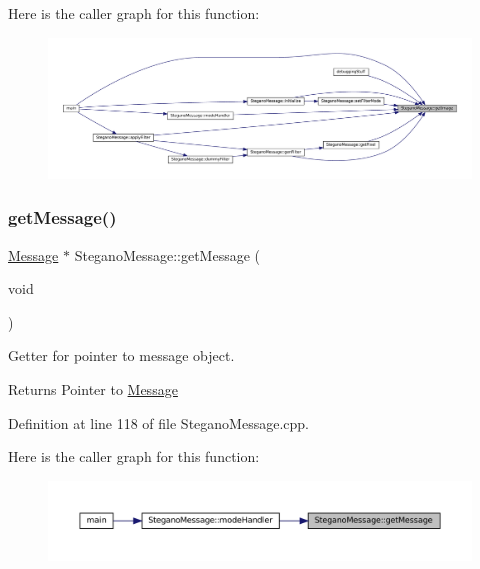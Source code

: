 Here is the caller graph for this function\+:
\nopagebreak
\begin{figure}[H]
\begin{center}
\leavevmode
\includegraphics[width=350pt]{classSteganoMessage_a2e3ad705a0219edfd2150f3f7931979c_icgraph}
\end{center}
\end{figure}
\mbox{\label{classSteganoMessage_ad29978e925056ad70dc5c45b1e1681eb}} 
\subsubsection{\texorpdfstring{getMessage()}{getMessage()}}
{\footnotesize\ttfamily \mbox{\hyperlink{classMessage}{Message}} $\ast$ Stegano\+Message\+::get\+Message (\begin{DoxyParamCaption}\item[{void}]{ }\end{DoxyParamCaption})}



Getter for pointer to message object. 

\begin{DoxyReturn}{Returns}
Pointer to \mbox{\hyperlink{classMessage}{Message}} 
\end{DoxyReturn}


Definition at line 118 of file Stegano\+Message.\+cpp.

Here is the caller graph for this function\+:
\nopagebreak
\begin{figure}[H]
\begin{center}
\leavevmode
\includegraphics[width=350pt]{classSteganoMessage_ad29978e925056ad70dc5c45b1e1681eb_icgraph}
\end{center}
\end{figure}
\mbox{\label{classSteganoMessage_a7dc660e6d2c8f162636f789cfedde67e}} 
